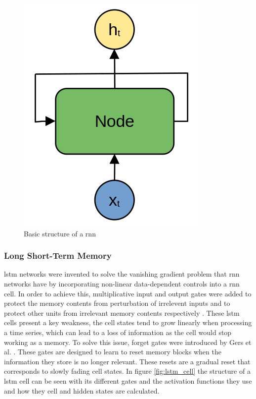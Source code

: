 \begin{figure}[h]
    \centering
    \includegraphics[scale=0.20]{images/rnn_basic.png}
    \caption{Basic structure of a \acrshort{rnn}}
    \label{fig:rnn_basic}
\end{figure}

\subsubsection{Long Short-Term Memory}
\acrfull{lstm} networks were invented to solve the vanishing gradient problem that \acrshort{rnn} networks have by incorporating non-linear data-dependent controls 
into a \acrshort{rnn} cell. In order to achieve this, multiplicative input and output gates were added to protect the memory contents from perturbation of irrelevent inputs
and to protect other units from irrelevant memory contents respectively \cite{LSTMoriginal}.
These \acrshort{lstm} cells present a key weakness, the cell states tend to grow linearly when processing a time series, which can lead to a loss of information as the cell
would stop working as a memory. To solve this issue, forget gates were introduced by Gers et al. \cite{LSTMforget}. These gates are designed to learn to reset memory blocks
when the information they store is no longer relevant. These resets are a gradual reset that corresponds to slowly fading cell states.
In figure \ref{fig:lstm_cell} the structure of a \acrshort{lstm} cell can be seen with its different gates and the activation functions they use and how they cell and hidden states
are calculated.

